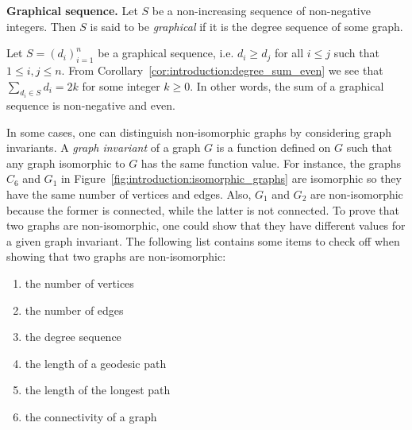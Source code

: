 \begin{definition}
\textbf{Graphical sequence.}
Let $S$ be a non-increasing sequence of non-negative integers. Then
$S$ is said to be \emph{graphical} if it is the degree sequence of
some graph.
\end{definition}



Let $S = (d_i)_{i=1}^{n}$ be a graphical sequence, i.e. $d_i \geq d_j$
for all $i \leq j$ such that $1 \leq i, j \leq n$. From
Corollary~\ref{cor:introduction:degree_sum_even} we see that
$\sum_{d_i \in S} d_i = 2k$ for some integer $k \geq 0$. In other
words, the sum of a graphical sequence is non-negative and
even.

In some cases, one can distinguish non-isomorphic graphs by
considering graph invariants. A \emph{graph invariant} of a graph $G$
is a function defined on $G$ such that any graph isomorphic to $G$ has
the same function value. For instance, the graphs $C_6$ and $G_1$ in
Figure~\ref{fig:introduction:isomorphic_graphs} are isomorphic so they
have the same number of vertices and edges. Also, $G_1$ and $G_2$ are
non-isomorphic because the former is connected, while the latter is
not connected. To prove that two graphs are non-isomorphic, one could
show that they have different values for a given graph invariant. The
following list contains some items to check off when showing that two
graphs are non-isomorphic:

\begin{enumerate}
\item the number of vertices

\item the number of edges

\item the degree sequence

\item the length of a geodesic path

\item the length of the longest path

\item the connectivity of a graph
\end{enumerate}


